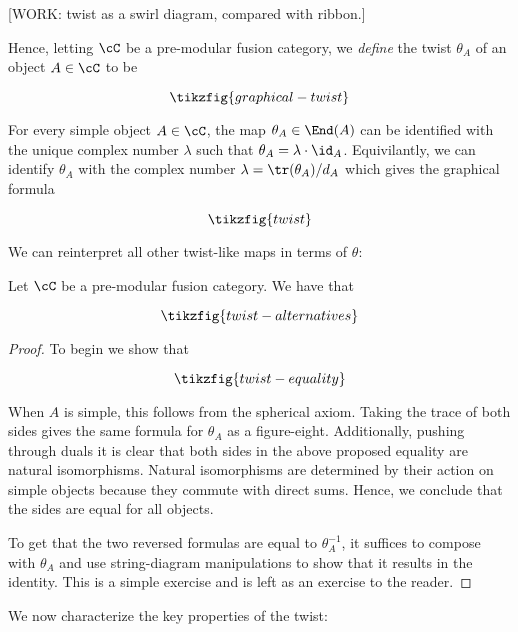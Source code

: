 [WORK: twist as a swirl diagram, compared with ribbon.]

Hence, letting $\cC$ be a pre-modular fusion category, we \textit{define} the twist $\theta_{A}$ of an object $A\in \cC$ to be

\begin{equation*}
\tikzfig{graphical-twist}
\end{equation*}

For every simple object $A\in \cC$, the map $\theta_A\in \End(A)$ can be identified with the unique complex number $\lambda$ such that $\theta_A=\lambda\cdot \id_A$. Equivilantly, we can identify $\theta_A$ with the complex number $\lambda=\tr(\theta_A)/d_A$ which gives the graphical formula

\begin{equation*}
\tikzfig{twist}
\end{equation*}

We can reinterpret all other twist-like maps in terms of $\theta$:

\begin{lem} Let $\cC$ be a pre-modular fusion category. We have that

\begin{equation*}
\tikzfig{twist-alternatives}
\end{equation*}

\end{lem}
\begin{proof} To begin we show that

\begin{equation*}
\tikzfig{twist-equality}
\end{equation*}

When $A$ is simple, this follows from the spherical axiom. Taking the trace of both sides gives the same formula for $\theta_A$ as a figure-eight. Additionally, pushing through duals it is clear that both sides in the above proposed equality are natural isomorphisms. Natural isomorphisms are determined by their action on simple objects because they commute with direct sums. Hence, we conclude that the sides are equal for all objects.

To get that the two reversed formulas are equal to $\theta_{A}^{-1}$, it suffices to compose with $\theta_A$ and use string-diagram manipulations to show that it results in the identity. This is a simple exercise and is left as an exercise to the reader.
\end{proof}

We now characterize the key properties of the twist:

